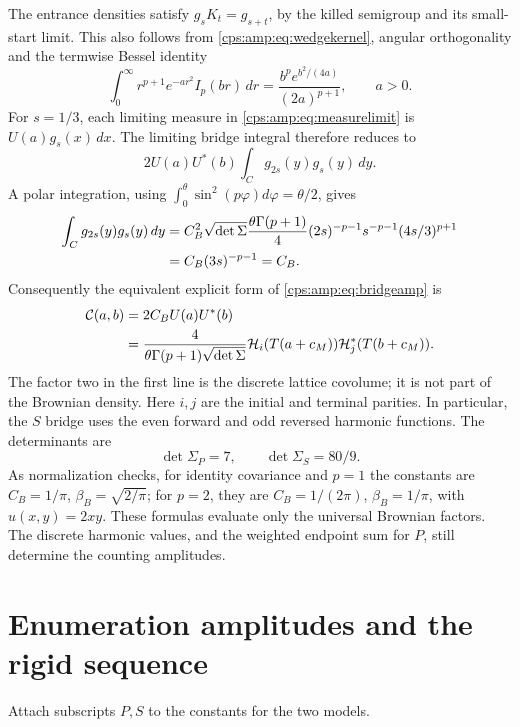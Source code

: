 \documentclass[11pt,letterpaper]{article}
\numberwithin{equation}{section}
\theoremstyle{remark}\newtheorem{remark}[theorem]{Remark}
\begin{document}
The entrance densities satisfy $g_sK_t=g_{s+t}$, by the killed semigroup and its small-start limit. This also follows from \eqref{cps:amp:eq:wedgekernel}, angular orthogonality and the termwise Bessel identity
\begin{equation}
 \int_0^\infty r^{p+1}e^{-ar^2}I_p(br)\,dr
 =\frac{b^p e^{b^2/(4a)}}{(2a)^{p+1}},\qquad a>0.
\end{equation}
For $s=1/3$, each limiting measure in \eqref{cps:amp:eq:measurelimit} is $U(a)g_s(x)\,dx$. The limiting bridge integral therefore reduces to
\begin{equation}
 2U(a)U^*(b)\int_C g_{2s}(y)g_s(y)\,dy.
\end{equation}
A polar integration, using $\int_0^\theta\sin^2(p\varphi)d\varphi=\theta/2$, gives
\begin{align}
 \int_Cg_{2s}(y)g_s(y)\,dy
 &=C_B^2\sqrt{\det\Sigma}\frac{\theta\Gamma(p+1)}4
   (2s)^{-p-1}s^{-p-1}(4s/3)^{p+1}\notag\\
 &=C_B(3s)^{-p-1}=C_B.
\end{align}
Consequently the equivalent explicit form of \eqref{cps:amp:eq:bridgeamp} is
\begin{align}\label{cps:amp:eq:explicitbridge}
 \mathcal C(a,b)&=2C_BU(a)U^*(b)\notag\\
 &=\frac{4}{\theta\Gamma(p+1)\sqrt{\det\Sigma}}
 \mathcal H_i(T(a+c_M))\mathcal H_j^*(T(b+c_M)).
\end{align}
The factor two in the first line is the discrete lattice covolume; it is not part of the Brownian density. Here $i,j$ are the initial and terminal parities. In particular, the $S$ bridge uses the even forward and odd reversed harmonic functions. The determinants are
\begin{equation}
 \det\Sigma_P=7,\qquad \det\Sigma_S=80/9.
\end{equation}
As normalization checks, for identity covariance and $p=1$ the constants are $C_B=1/\pi$, $\beta_B=\sqrt{2/\pi}$; for $p=2$, they are $C_B=1/(2\pi)$, $\beta_B=1/\pi$, with $u(x,y)=2xy$. These formulas evaluate only the universal Brownian factors. The discrete harmonic values, and the weighted endpoint sum for $P$, still determine the counting amplitudes.

\section{Enumeration amplitudes and the rigid sequence}\label{cps:amp:sec:enumeration}
Attach subscripts $P,S$ to the constants for the two models.
\end{document}
